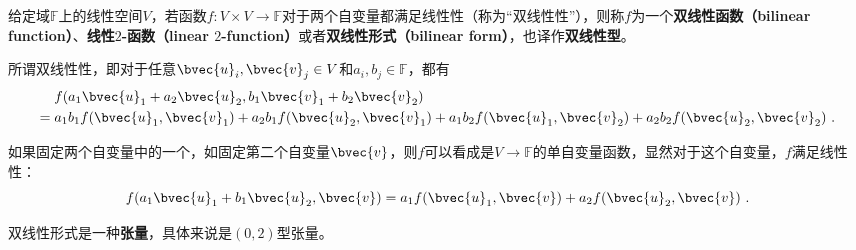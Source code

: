 


给定域$\mathbb{F}$上的线性空间$V$，若函数$f:V\times V\to \mathbb{F}$对于两个自变量都满足线性性（称为“双线性性”），则称$f$为一个\textbf{双线性函数（bilinear function）}、\textbf{线性$2$-函数（linear $2$-function）}或者\textbf{双线性形式（bilinear form）}，也译作\textbf{双线性型}。


所谓双线性性，即对于任意$\bvec{u}_i, \bvec{v}_j\in V$和$a_i, b_j\in\mathbb{F}$，都有
\begin{equation}
\begin{aligned}
&f(a_1\bvec{u}_1+a_2\bvec{u}_2, b_1\bvec{v}_1+b_2\bvec{v}_2)\\
={}& a_1b_1f(\bvec{u}_1, \bvec{v}_1)+a_2b_1f(\bvec{u}_2, \bvec{v}_1)+a_1b_2f(\bvec{u}_1, \bvec{v}_2)+a_2b_2f(\bvec{u}_2, \bvec{v}_2)~. 
\end{aligned}
\end{equation}

如果固定两个自变量中的一个，如固定第二个自变量$\bvec{v}$，则$f$可以看成是$V\to \mathbb{F}$的单自变量函数，显然对于这个自变量，$f$满足线性性：
\begin{equation}
f(a_1\bvec{u}_1+b_1\bvec{u}_2, \bvec{v})=a_1f(\bvec{u}_1, \bvec{v})+a_2f(\bvec{u}_2, \bvec{v})~. 
\end{equation}






双线性形式是一种\textbf{张量}，具体来说是$(0, 2)$型张量。

















